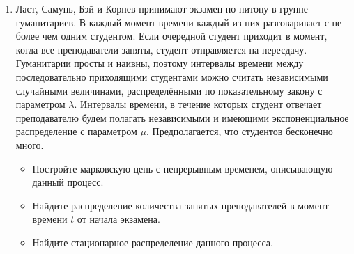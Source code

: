 \documentclass[a4paper, 14pt]{extarticle}
\begin{document}
\begin{enumerate}
\item Ласт, Самунь, Бэй и Корнев принимают экзамен по питону в группе гуманитариев. В каждый момент времени каждый из них разговаривает с не более чем одним студентом. Если очередной студент приходит в момент, когда все преподаватели заняты, студент отправляется на пересдачу. Гуманитарии просты и наивны, поэтому интервалы времени между последовательно приходящими студентами можно считать независимыми случайными величинами, распределёнными по показательному закону с параметром $\lambda$. Интервалы времени, в течение которых студент отвечает преподавателю будем полагать независимыми и имеющими экспоненциальное распределение с параметром $\mu$. Предполагается, что студентов бесконечно много.
\begin{itemize}
\item Постройте марковскую цепь с непрерывным временем, описывающую данный процесс.
\item Найдите распределение количества занятых преподавателей в момент времени $t$ от начала экзамена. 
\item Найдите стационарное распределение данного процесса.
\end{itemize}

\end{enumerate}
\newpage
\end{document}
